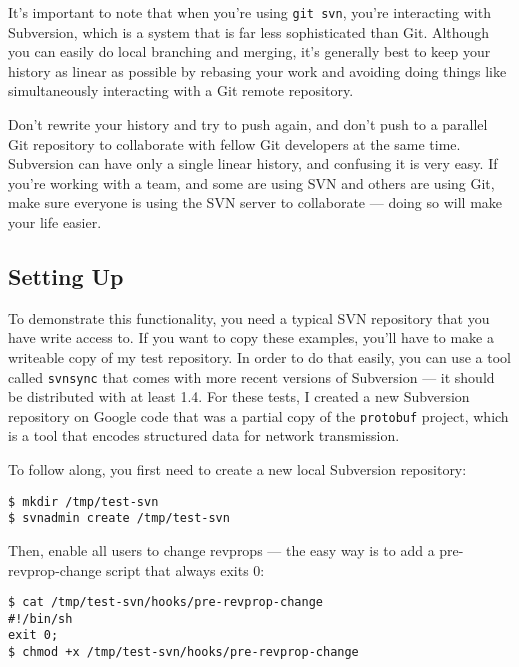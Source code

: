 \documentclass[a4paper]{book}
\begin{document}
It's important to note that when you're using \texttt{git svn}, you're interacting with Subversion, which is a system that is far less sophisticated than Git. Although you can easily do local branching and merging, it's generally best to keep your history as linear as possible by rebasing your work and avoiding doing things like simultaneously interacting with a Git remote repository.

Don't rewrite your history and try to push again, and don't push to a parallel Git repository to collaborate with fellow Git developers at the same time. Subversion can have only a single linear history, and confusing it is very easy. If you're working with a team, and some are using SVN and others are using Git, make sure everyone is using the SVN server to collaborate --- doing so will make your life easier.

\subsection{Setting Up}

To demonstrate this functionality, you need a typical SVN repository that you have write access to. If you want to copy these examples, you'll have to make a writeable copy of my test repository. In order to do that easily, you can use a tool called \texttt{svnsync} that comes with more recent versions of Subversion --- it should be distributed with at least 1.4. For these tests, I created a new Subversion repository on Google code that was a partial copy of the \texttt{protobuf} project, which is a tool that encodes structured data for network transmission.

To follow along, you first need to create a new local Subversion repository:

\begin{shaded}\begin{verbatim}
$ mkdir /tmp/test-svn
$ svnadmin create /tmp/test-svn
\end{verbatim}\end{shaded}

Then, enable all users to change revprops --- the easy way is to add a pre-revprop-change script that always exits 0:

\begin{shaded}\begin{verbatim}
$ cat /tmp/test-svn/hooks/pre-revprop-change
#!/bin/sh
exit 0;
$ chmod +x /tmp/test-svn/hooks/pre-revprop-change
\end{verbatim}\end{shaded}
\end{document}
